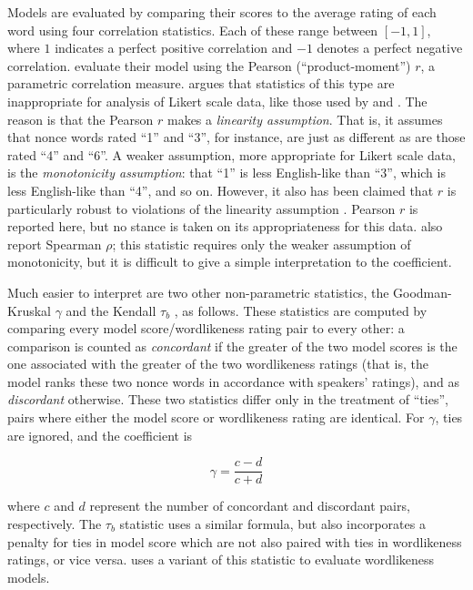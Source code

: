 Models are evaluated by comparing their scores to the average rating of each word using four correlation statistics. Each of these range between $[-1, 1]$, where $1$ indicates a perfect positive correlation and $-1$ denotes a perfect negative correlation. \citet{Hayes2008a} evaluate their model using the Pearson (``product-moment'') $r$, a parametric correlation measure.  \citet{Stevens1946} argues that statistics of this type are inappropriate for analysis of Likert scale data, like those used by \citet{Albright2007} and \citet{Albright2003b}.
The reason is that the Pearson $r$ makes a \emph{linearity assumption}. That is, it assumes that nonce words rated ``1'' and  ``3'', for instance, are just as different as are those rated ``4'' and ``6''. A weaker assumption, more appropriate for Likert scale data, is the \emph{monotonicity assumption}: that ``1'' is less English-like than ``3'', which is less English-like than ``4'', and so on. However, it also has been claimed that $r$ is particularly robust to violations of the linearity assumption \citep[e.g.,][]{Havlicek1976}. Pearson $r$ is reported here, but no stance is taken on its appropriateness for this data.
\citeauthor{Hayes2008a} also report Spearman $\rho$; this statistic requires only the weaker assumption of monotonicity, but it is difficult to give a simple interpretation to the coefficient. 

Much easier to interpret are two other non-parametric statistics, the Goodman-Kruskal $\gamma$ and the Kendall $\tau_b$ \citep{Noether1981}, as follows. These statistics are computed by comparing every model score/wordlikeness rating pair to every other: a comparison is counted as \emph{concordant} if the greater of the two model scores is the one associated with the greater of the two wordlikeness ratings (that is, the model ranks these two nonce words in accordance with speakers' ratings), and as \emph{discordant} otherwise. These two statistics differ only in the treatment of ``ties'', pairs where either the model score or wordlikeness rating are identical. For $\gamma$, ties are ignored, and the coefficient is 

\begin{equation*}
\gamma = \displaystyle\frac{c - d}{c + d}
\end{equation*}

\noindent
where $c$ and $d$ represent the number of concordant and discordant pairs, respectively. The $\tau_b$ statistic uses a similar formula, but also incorporates a penalty for ties in model score which are not also paired with ties in wordlikeness ratings, or vice versa. \citet{Albright2009a} uses a variant of this statistic to evaluate wordlikeness models.

